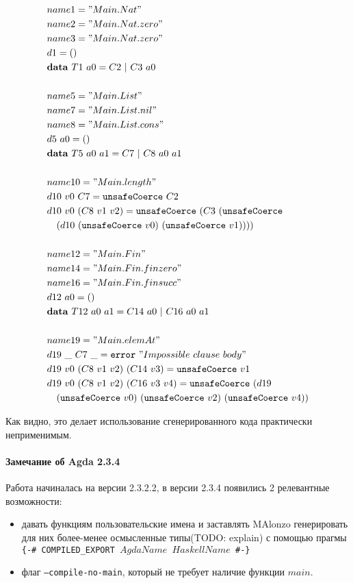\begin{align*}
&name1 = "Main.Nat"\\
&name2 = "Main.Nat.zero"\\
&name3 = "Main.Nat.zero"\\
&d1 = ()\\
&\mathbf{data}\ T1\ a0 = C2\ |\ C3\ a0\\
\\
&name5 = "Main.List"\\
&name7 = "Main.List.nil"\\
&name8 = "Main.List.cons"\\
&d5\ a0 = ()\\
&\mathbf{data}\ T5\ a0\ a1 = C7\ |\ C8\ a0\ a1\\
\\
&name10 = "Main.length"\\
&d10\ v0\ C7 = \texttt{unsafeCoerce}\ C2\\
&d10\ v0\ (C8\ v1\ v2) = \texttt{unsafeCoerce}\ (C3\ (\texttt{unsafeCoerce}\\
&\quad(d10\ (\texttt{unsafeCoerce}\ v0)\ (\texttt{unsafeCoerce}\ v1))))\\
\\
&name12 = "Main.Fin"\\
&name14 = "Main.Fin.finzero"\\
&name16 = "Main.Fin.finsucc"\\
&d12\ a0 = ()\\
&\mathbf{data}\ T12\ a0\ a1 = C14\ a0\ |\ C16\ a0\ a1\\
\\
&name19 = "Main.elemAt"\\
&d19\ \_\ C7\ \_ = \texttt{error}\ "Impossible\ clause\ body"\\
&d19\ v0\ (C8\ v1\ v2)\ (C14\ v3) = \texttt{unsafeCoerce}\ v1\\
&d19\ v0\ (C8\ v1\ v2)\ (C16\ v3\ v4) = \texttt{unsafeCoerce}\ (d19\\
&\quad(\texttt{unsafeCoerce}\ v0)\ (\texttt{unsafeCoerce}\ v2)\ (
   \texttt{unsafeCoerce}\ v4))
\end{align*}

Как видно, это делает использование сгенерированного кода
практически неприменимым.

\paragraph{Замечание об Agda 2.3.4}

Работа начиналась на версии 2.3.2.2, в версии 2.3.4 появились 2 релевантные возможности:
\begin{itemize}
\item давать функциям пользовательские имена и заставлять MAlonzo генерировать для них
      более-менее осмысленные типы(TODO: explain) с помощью прагмы
      \texttt{\{-\# COMPILED\_EXPORT \(AgdaName\) \(HaskellName\) \#-\}}
\item флаг \texttt{---compile-no-main}, который не требует наличие функции \(main\).
\end{itemize}

